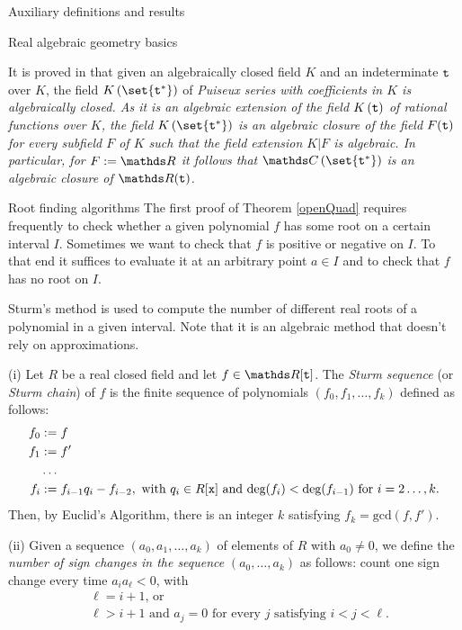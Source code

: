 \documentclass[11pt, a4paper, english, twoside, notitlepage, openright]{report}
\begin{document}
\begin{chapter}{Auxiliary definitions and results}
\begin{section}{Real algebraic geometry basics}
\begin{definition} \label{puiseux} It is proved in \cite[pp. 98-102]{w} that given an algebraically closed field $K$ and an indeterminate ${\tt t}$ over $K$, the field $K\left(\set{{\tt t}^*}\right)$ of \em Puiseux series \em with coefficients in $K$ is algebraically closed. As it is an algebraic extension of the field $K\left({\tt t}\right)$ of rational functions over $K$, the field $K\left(\set{{\tt t}^*}\right)$ is an algebraic closure of the field $F({\tt t})$ for every subfield $F$ of $K$ such that the field extension $K|F$ is algebraic. In particular, for $F:=\R$ it follows that $\C\left(\set{{\tt t}^*}\right)$ is an algebraic closure of $\R({\tt t})$.
\end{definition}
\end{section}

\begin{section}{Root finding algorithms}
The first proof of Theorem \ref{openQuad} requires frequently to check whether a given polynomial $f$ has some root on a certain interval $I$. Sometimes we want to check that $f$ is positive or negative on $I$. To that end it suffices to evaluate it at an arbitrary point $a\in I$ and to check that $f$ has no root on $I$.

Sturm's method is used to compute the number of different real roots of a polynomial in a given interval. Note that it is an algebraic method that doesn't rely on approximations.

\begin{definitions}\label{sturmSeq} (i) Let $R$ be a real closed field and let $f\in\R[{\tt t}]$. The \emph{Sturm sequence} (or \emph{Sturm chain}) of $f$ is the finite sequence of polynomials $(f_0,f_1,\dots,f_k)$ defined as follows: 
\begin{equation*}
\begin{aligned}
f_0&:=f\\
f_1&:=f'\\
&\dots\\
f_i&:=f_{i-1}q_i-f_{i-2}, \text{ with }q_{i}\in R[{\tt x}] \text{ and } \text{deg}(f_{i})<\text{deg}(f_{i-1}) \text{ for } i=2\dots,k.\\
\end{aligned}
\end{equation*}
Then, by Euclid's Algorithm, there is an integer $k$ satisfying $f_k=\text{gcd}(f,f')$.
	
(ii) Given a sequence $(a_0, a_1, \dots, a_k)$ of elements of $R$ with $a_0 \ne 0$, we define the \emph{number of sign changes in the sequence} $(a_0, \dots, a_k)$ as follows: count one sign change every time $a_ia_{\ell} < 0$, with 
\begin{equation*}
\begin{aligned}
&\ell=i+1 \text{, or }\\
&\ell>i+1 \text{ and }a_j=0 \text{ for every } j \text{ satisfying  } i<j<\ell.\\ 
\end{aligned}
\end{equation*}


\end{definitions}
\end{section}
\end{chapter}
\end{document}
